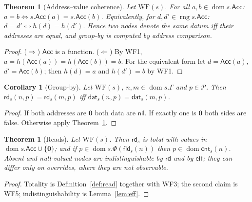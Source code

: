 \documentclass[11pt,a4paper]{article}
\theoremstyle{definition}
\theoremstyle{plain}
\newtheorem{theorem}[definition]{Theorem}
\newtheorem{corollary}[definition]{Corollary}
\theoremstyle{remark}
\newcommand{\Prp}{\mathcal{P}}
\newcommand{\nul}{\mathbf{0}}
\newcommand{\nil}{\mathsf{nil}}
\newcommand{\dom}{\operatorname{dom}}
\newcommand{\rng}{\operatorname{rng}}
\newcommand{\rd}{\mathsf{rd}}
\newcommand{\eff}{\mathsf{eff}}
\newcommand{\fld}{\mathsf{fld}}
\newcommand{\cnt}{\mathsf{cnt}}
\newcommand{\Acc}{\mathsf{Acc}}
\begin{document}
\begin{theorem}[Address--value coherence]\label{thm:coherence}
Let $\mathrm{WF}(s)$. For all $a,b\in\dom s.\Acc$: $a=b\iff s.\Acc(a)=s.\Acc(b)$.
Equivalently, for $d,d'\in\rng s.\Acc$: $d=d'\iff h(d)=h(d')$.
Hence two nodes denote the same datum iff their addresses are equal, and group-by is computed by address comparison.
\end{theorem}
\begin{proof}
($\Rightarrow$) $\Acc$ is a function. ($\Leftarrow$) By WF1, $a=h(\Acc(a))=h(\Acc(b))=b$.
For the equivalent form let $d=\Acc(a)$, $d'=\Acc(b)$; then $h(d)=a$ and $h(d')=b$ by WF1.
\end{proof}

\begin{corollary}[Group-by]\label{cor:group}
Let $\mathrm{WF}(s)$, $n,m\in\dom s.\Gamma$ and $p\in\Prp$. Then $\rd_s(n,p)=\rd_s(m,p)$ iff $\mathsf{dat}_s(n,p)=\mathsf{dat}_s(m,p)$.
\end{corollary}
\begin{proof}
If both addresses are $\nul$ both data are $\nil$. If exactly one is $\nul$ both sides are false. Otherwise apply Theorem~\ref{thm:coherence}.
\end{proof}

\begin{theorem}[Reads]\label{thm:reads}
Let $\mathrm{WF}(s)$. Then $\rd_s$ is total with values in $\dom s.\Acc\cup\{\nul\}$; and if $p\in\dom s.\Phi(\fld_s(n))$ then $p\in\dom\cnt_s(n)$.
Absent and null-valued nodes are indistinguishable by $\rd$ and by $\eff$; they can differ only on overrides, where they are not observable.
\end{theorem}
\begin{proof}
Totality is Definition~\ref{def:read} together with WF3; the second claim is WF5; indistinguishability is Lemma~\ref{lem:eff}.
\end{proof}
\end{document}
